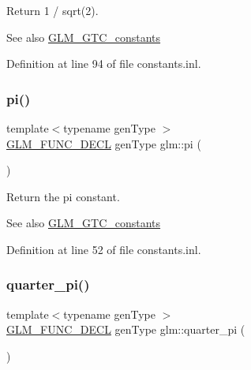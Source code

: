 Return 1 / sqrt(2). \begin{DoxySeeAlso}{See also}
\hyperlink{group__gtc__constants}{G\+L\+M\+\_\+\+G\+T\+C\+\_\+constants} 
\end{DoxySeeAlso}


Definition at line 94 of file constants.\+inl.

\mbox{\label{group__gtc__constants_gae671930537266a9a650ccb4b88757692}} 
\subsubsection{\texorpdfstring{pi()}{pi()}}
{\footnotesize\ttfamily template$<$typename gen\+Type $>$ \\
\hyperlink{setup_8hpp_ab2d052de21a70539923e9bcbf6e83a51}{G\+L\+M\+\_\+\+F\+U\+N\+C\+\_\+\+D\+E\+CL} gen\+Type glm\+::pi (\begin{DoxyParamCaption}{ }\end{DoxyParamCaption})}

Return the pi constant. \begin{DoxySeeAlso}{See also}
\hyperlink{group__gtc__constants}{G\+L\+M\+\_\+\+G\+T\+C\+\_\+constants} 
\end{DoxySeeAlso}


Definition at line 52 of file constants.\+inl.

\mbox{\label{group__gtc__constants_ga0148d757b4bfda4d86251b8d1ea1dad3}} 
\subsubsection{\texorpdfstring{quarter\+\_\+pi()}{quarter\_pi()}}
{\footnotesize\ttfamily template$<$typename gen\+Type $>$ \\
\hyperlink{setup_8hpp_ab2d052de21a70539923e9bcbf6e83a51}{G\+L\+M\+\_\+\+F\+U\+N\+C\+\_\+\+D\+E\+CL} gen\+Type glm\+::quarter\+\_\+pi (\begin{DoxyParamCaption}{ }\end{DoxyParamCaption})}

